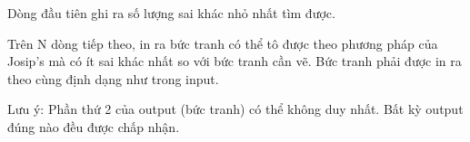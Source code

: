 Dòng đầu tiên ghi ra số lượng sai khác nhỏ nhất tìm được.  

   Trên N dòng tiếp theo, in ra bức tranh có thể tô được theo phương pháp của Josip's mà có ít sai khác nhất so với bức tranh cần vẽ. Bức tranh phải được in ra theo cùng định dạng như trong input.  

   Lưu ý: Phần thứ 2 của output (bức tranh) có thể không duy nhất. Bất kỳ output đúng nào đều được chấp nhận.  

\